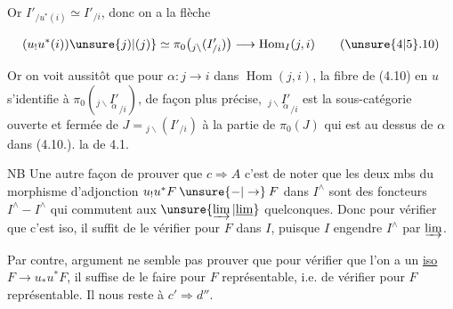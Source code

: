 Or $I'_{/u^*(i)}\simeq I'_{/i}$,  donc on a la flèche

\[
 (u_!u^*(i))\unsure{j)|(j)}\simeq\pi_0\bigl({}_{j\backslash}(I'_{/i})\bigr)\longrightarrow\operatorname{Hom}_I(j,i)
 \tag*{(\unsure{4|5}.10)}
\]

Or on voit aussitôt que pour $\alpha\colon j\longrightarrow i$ dans $\operatorname{Hom}(j,i)$, la fibre de (4.10) en $u$ s'identifie à $\pi_0({}_{j\backslash}\underset{\alpha}{I'}_{/i})$, de façon plus précise, $\,{}_{j\backslash}\underset{\alpha}{I'}_{/i}$ est la sous-catégorie ouverte et fermée de $J={}_{j\backslash}(I'_{/i})$  à la partie de $\pi_0(J)$  qui est au dessus de $\alpha$ dans (4.10.).   la   de 4.1.


NB Une autre façon de prouver que $c\Rightarrow A$ c'est de noter que les deux mbs du  morphisme d'adjonction $u_!u^*F\mathbin{\unsure{-|\to}}F$ dans $I^\wedge$ sont des foncteurs $I^\wedge\mathbin{-}I^\wedge$ qui commutent aux $\unsure{\varinjlim|\underline{\lim}}$ quelconques. Donc pour vérifier que  c'est iso, il suffit de le vérifier pour $F$ dans $I$, puisque $I$ engendre $I^\wedge$ par $\varinjlim$.

Par contre,   argument  ne semble pas prouver que pour vérifier que l'on a un \uline{iso} $F\to u_*u^*F$, il suffise de le faire pour $F$ représentable,  i.e. de vérifier  pour $F$ représentable.  Il nous reste à   $c'\Rightarrow d''$.
